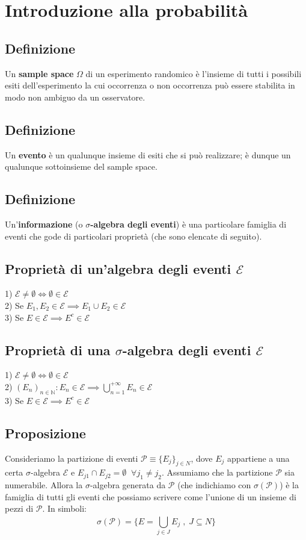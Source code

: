\documentclass{article}
\begin{document}
\section*{Introduzione alla probabilità}
\subsection*{Definizione}
Un \textbf{sample space} $\Omega$ di un esperimento randomico è l'insieme di tutti i possibili esiti dell'esperimento la cui occorrenza o non occorrenza può essere stabilita in modo non ambiguo da un osservatore.

\subsection*{Definizione}
Un \textbf{evento} è un qualunque insieme di esiti che si può realizzare; è dunque un qualunque sottoinsieme del sample space.

\subsection*{Definizione}
Un'\textbf{informazione} (o \textbf{$\sigma$-algebra degli eventi}) è una particolare famiglia di eventi che gode di particolari proprietà (che sono elencate di seguito).

\subsection*{Proprietà di un'algebra degli eventi $\mathcal{E}$}
1) $\mathcal{E} \neq \emptyset \iff \emptyset \in \mathcal{E}$\\
2) Se $E_{1}, E_{2} \in \mathcal{E} \implies E_{1} \cup E_{2} \in \mathcal{E}$\\
3) Se $E \in \mathcal{E} \implies E^{c} \in \mathcal{E}$

\subsection*{Proprietà di una $\sigma$-algebra degli eventi $\mathcal{E}$}
1) $\mathcal{E} \neq \emptyset \iff \emptyset \in \mathcal{E}$\\
2) $(E_{n})_{n \in \mathbb{N}} : E_{n} \in \mathcal{E} \implies \bigcup_{n=1}^{+\infty}E_{n} \in \mathcal{E}$\\
3) Se $E \in \mathcal{E} \implies E^{c} \in \mathcal{E}$

\subsection*{Proposizione}
Consideriamo la partizione di eventi $\mathcal{P} \equiv \{E_{j}\}_{j \in N}$, dove $E_{j}$ appartiene a una certa $\sigma$-algebra $\mathcal{E}$ e $E_{j1} \cap E_{j2} = \emptyset \; \; \forall j_{1} \neq j_{2}$. Assumiamo che la partizione $\mathcal{P}$ sia numerabile. Allora la $\sigma$-algebra generata da $\mathcal{P}$ (che indichiamo con $\sigma(\mathcal{P})$) è la famiglia di tutti gli eventi che possiamo scrivere come l'unione di un insieme di pezzi di $\mathcal{P}$. In simboli:
\[ \sigma(\mathcal{P}) = \Big\{E = \bigcup_{j\in J}^{}E_{j} \; , \; J \subseteq N \Big\} \]
\end{document}
